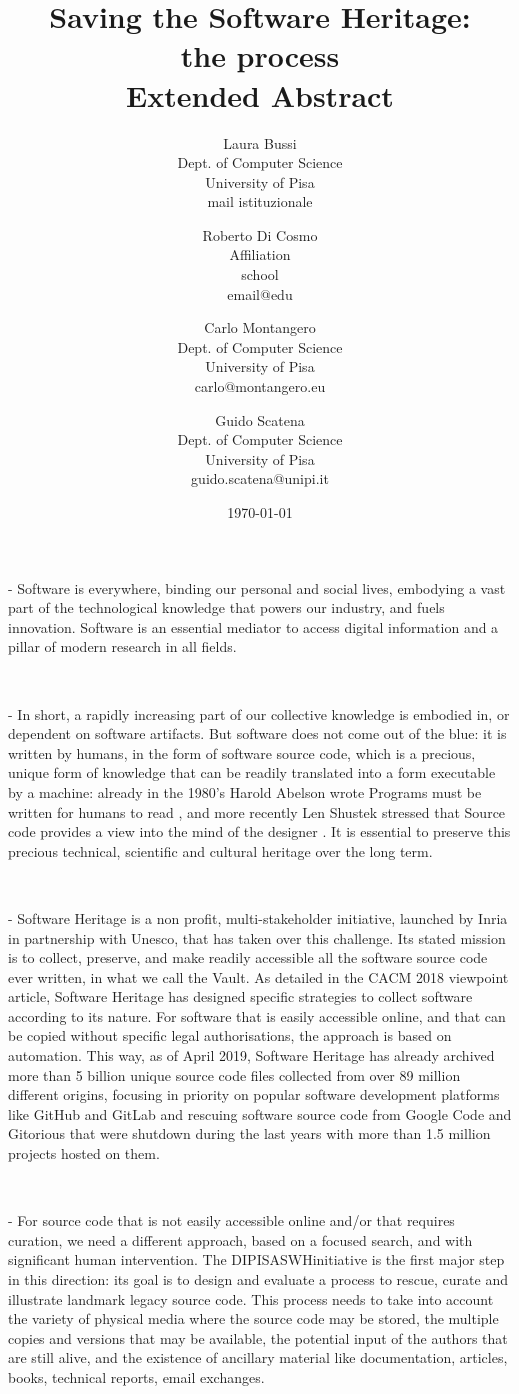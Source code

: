 \documentclass[a4paper]{article}
\title{Saving the Software Heritage:
				\\ the process  
				\\ 	\large Extended Abstract
}
\author{
    Laura Bussi\\
    Dept. of Computer Science\\
    University of Pisa\\
    mail istituzionale
	\and
    Roberto Di Cosmo\\
    Affiliation\\
    school\\
    email@edu
  \and
    Carlo Montangero\\
    Dept. of Computer Science\\
    University of Pisa\\
    carlo@montangero.eu
  \and
    Guido Scatena\\
		Dept. of Computer Science\\
    University of Pisa\\
    guido.scatena@unipi.it
}
\date{\today}
\newcommand{\DIPISASWHinitiative}{DIPISASWHinitiative }
\begin{document}
\maketitle

 - Software is everywhere,  binding our personal and social lives, embodying a vast part of the technological knowledge that powers our industry, and fuels innovation. Software is an essential mediator to access digital information and a pillar of modern research in all fields.

\

 - In short, a rapidly increasing part of our collective knowledge is embodied in, or dependent on software artifacts. But software does not come out of the blue: it is written by humans, in the form of software source code, which is a precious, unique form of knowledge that can be readily translated into a form executable by a machine: already in the 1980's Harold Abelson wrote Programs must be written for humans to read \cite{AbelsonS85}, and more recently Len Shustek stressed that Source code provides a view into the mind of the designer \cite{Shustek06}. It is essential to preserve this precious technical, scientific and cultural heritage over the long term.

\

 - Software Heritage is a non profit, multi-stakeholder initiative, launched by Inria in partnership with Unesco, that has taken over this challenge. Its stated mission is to collect, preserve, and make readily accessible all the software source code ever written, in what we call the Vault. As detailed in the CACM 2018 viewpoint article, Software Heritage has designed specific strategies to collect software according to its nature. For software that is easily accessible online, and that can be copied without specific legal authorisations, the approach is based on automation. This way, as of April 2019, Software Heritage has already archived more than 5 billion unique source code files collected from over 89 million different origins, focusing in priority on popular software development platforms like GitHub and GitLab and rescuing software source code from Google Code and Gitorious that were shutdown during the last years with more than 1.5 million projects hosted on them.

\

 - For source code that is not easily accessible online and/or that requires curation, we need a different approach, based on a focused search, and with significant human intervention. The \DIPISASWHinitiative is the first major step in this direction: its goal is to design and evaluate a process to rescue, curate and illustrate landmark legacy source code. This process needs to take into account the variety of physical media where the source code may be stored, the multiple copies and versions that may be available, the potential input of the authors that are still alive, and the existence of ancillary material like documentation, articles, books, technical reports, email exchanges.
\end{document}
